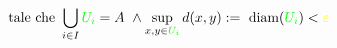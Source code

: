 \documentclass[preview]{standalone}
\begin{document}
\begin{align*}
\text{ tale che } \bigcup_{i \in I} \textcolor{green}{U_i} = A  \ \land \sup_{x,y \in \textcolor{green}{U_i}} d(x,y) := \text{ diam}(\textcolor{green}{U_i}) < \textcolor{yellow}{\varepsilon}
\end{align*}
\end{document}
